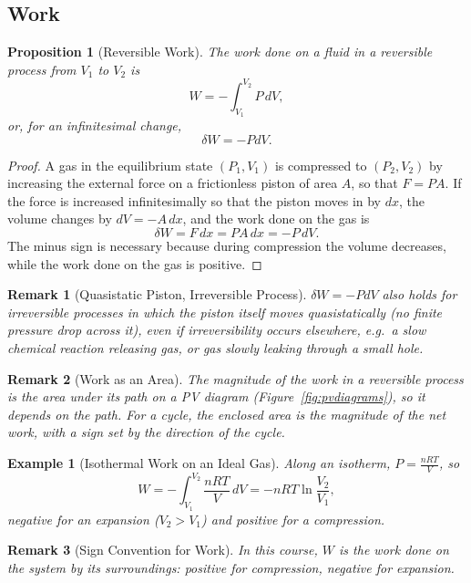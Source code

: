 \documentclass{article}
\newtheorem{example}{Example}
\newtheorem{remark}{Remark}
\newtheorem{proposition}{Proposition}
\begin{document}
\subsection{Work}
\begin{proposition}[Reversible Work]
    The work done on a fluid in a reversible process from $V_1$ to $V_2$ is
    \begin{equation}
        W = -\int_{V_1}^{V_2} P\,dV,
    \end{equation}
    or, for an infinitesimal change,
    \begin{equation}
        \label{eq:reversible-work}
        \delta W = -PdV.
    \end{equation}
\end{proposition}
\begin{proof}
    A gas in the equilibrium state $(P_1, V_1)$ is compressed to $(P_2, V_2)$ by increasing the external force on a frictionless piston of area $A$, so that $F = PA$. If the force is increased infinitesimally so that the piston moves in by $dx$, the volume changes by $dV = -A\,dx$, and the work done on the gas is
    \[\delta W = F\,dx = PA\,dx = -P\,dV.\]
    The minus sign is necessary because during compression the volume decreases, while the work done on the gas is positive.
\end{proof}
\begin{remark}[Quasistatic Piston, Irreversible Process]
    $\delta W = -PdV$ also holds for irreversible processes in which the piston itself moves quasistatically (no finite pressure drop across it), even if irreversibility occurs elsewhere, e.g.\ a slow chemical reaction releasing gas, or gas slowly leaking through a small hole.
\end{remark}
\begin{remark}[Work as an Area]
    The magnitude of the work in a reversible process is the area under its path on a PV diagram (Figure~\ref{fig:pvdiagrams}), so it depends on the path. For a cycle, the enclosed area is the magnitude of the net work, with a sign set by the direction of the cycle.
\end{remark}
\begin{example}[Isothermal Work on an Ideal Gas]
    Along an isotherm, $P = \frac{nRT}{V}$, so
    \[W = -\int_{V_1}^{V_2}\frac{nRT}{V}\,dV = -nRT\ln\frac{V_2}{V_1},\]
    negative for an expansion ($V_2 > V_1$) and positive for a compression.
\end{example}
\begin{remark}[Sign Convention for Work]
    In this course, $W$ is the work done on the system by its surroundings: positive for compression, negative for expansion.
\end{remark}
\end{document}
